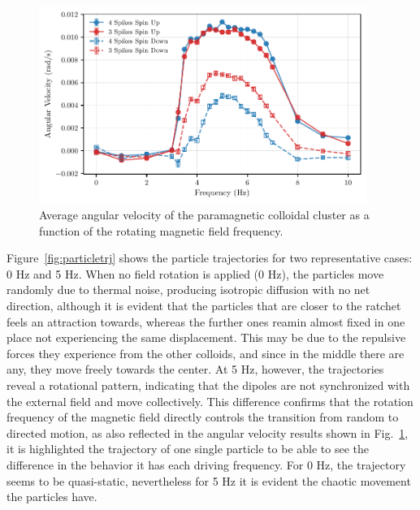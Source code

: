 \begin{figure}[h]
\begin{center}
\includegraphics[width=0.95\textwidth]{figures/AvsF.pdf}
\end{center}
\caption[Angular velocity as a function of driving frequency.]
{Average angular velocity of the paramagnetic colloidal cluster as a function of the rotating magnetic field frequency.}
\label{fig:angularvsfrequency}
\end{figure}


Figure~\ref{fig:particletrj} shows the particle trajectories for two representative cases: 0 Hz and 5 Hz. When no field rotation is applied (0 Hz), the particles move randomly due to thermal noise, producing isotropic diffusion with no net direction, although it is evident that the particles that are closer to the ratchet feels an attraction towards, whereas the further ones reamin almost fixed in one place not experiencing the same displacement. This may be due to the repulsive forces they experience from the other colloids, and since in the middle there are any, they move freely towards the center. At 5 Hz, however, the trajectories reveal a rotational pattern, indicating that the dipoles are not synchronized with the external field and move collectively. This difference confirms that the rotation frequency of the magnetic field directly controls the transition from random to directed motion, as also reflected in the angular velocity results shown in Fig.~\ref{fig:angularvsfrequency}, it is highlighted the trajectory of one single particle to be able to see the difference in the behavior it has each driving frequency. For 0 Hz, the trajectory seems to be quasi-static, nevertheless for 5 Hz it is evident the chaotic movement the particles have.

